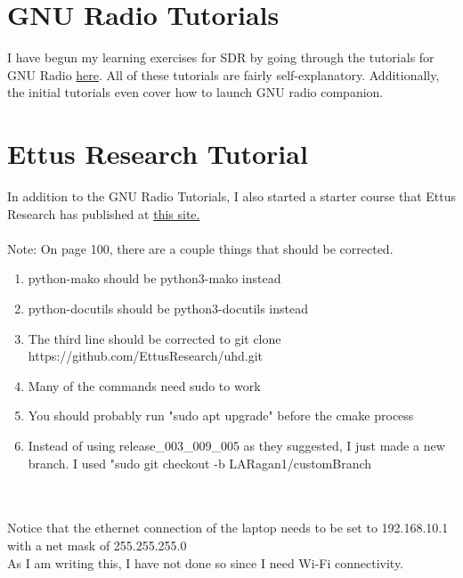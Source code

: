 \documentclass{article}
\begin{document}
\section{GNU Radio Tutorials}
I have begun my learning exercises for SDR by going through the 
tutorials for GNU Radio \href{https://wiki.gnuradio.org/index.php?title=Tutorials}{here}.
All of these tutorials are fairly self-explanatory. Additionally, the initial tutorials even
cover how to launch GNU radio companion.

\section{Ettus Research Tutorial}
In addition to the GNU Radio Tutorials, I also started a starter course that Ettus 
Research has published at \href{https://kb.ettus.com/images/4/47/Workshop_GnuRadio_Slides_20190507.pdf}{this site.}
\\ \\
Note: On page 100, there are a couple things that should be corrected.
\begin{enumerate}
    \item python-mako should be python3-mako instead 
    \item python-docutils should be python3-docutils instead 
    \item The third line should be corrected to git clone https://github.com/EttusResearch/uhd.git 
    \item Many of the commands need sudo to work
    \item You should probably run "sudo apt upgrade" before the cmake process 
    \item Instead of using release_003_009_005 as they suggested, I just made a new branch. I used "sudo git checkout -b LARagan1/customBranch
\end{enumerate}
\\ \\
Notice that the ethernet connection of the laptop needs to be set to 192.168.10.1 with a net 
mask of 255.255.255.0 \\
As I am writing this, I have not done so since I need Wi-Fi connectivity.
\end{document}
